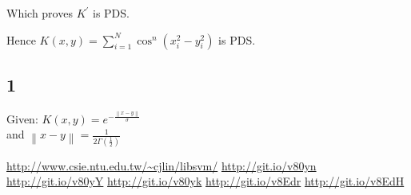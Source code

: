 \documentclass{article}
\begin{document}
\begin{description}
    Which proves \( K^{'} \) is PDS. 


    Hence \( K(x,y) = \sum_{i=1}^{N} \cos^{n} (x_{i}^{2} - y_{i}^{2} ) \) is PDS.
\end{description}

\subsection*{1}
\begin{description}
  \item{Given:} \( K(x,y) = e^{-\frac{ \left\lVert x - y \right\rVert }{\sigma}} \) \\
    and \( \left\lVert x - y \right\rVert  = \frac{1}{2\Gamma(\frac{1}{2})} \)
\end{description}

\begin{thebibliography}{1}
   \url{http://www.csie.ntu.edu.tw/~cjlin/libsvm/}
   \url{http://git.io/v80yn}
   \url{http://git.io/v80yY}
   \url{http://git.io/v80yk}
   \url{http://git.io/v8Edr}
   \url{http://git.io/v8EdH}
\end{thebibliography}
\end{document}
